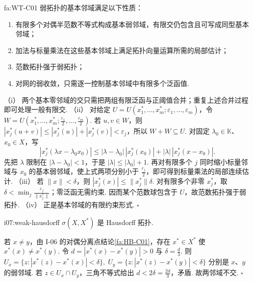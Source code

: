 \begin{FAProposition}[C][弱邻域计算工具]{fa:WT-C01}
弱拓扑的基本邻域满足以下性质：
\begin{enumerate}[label=\textnormal{(\roman*)}]
\item 有限多个对偶半范数不等式构成基本弱邻域，有限交仍包含且可写成同型基本邻域；
\item 加法与标量乘法在这些基本邻域上满足拓扑向量运算所需的局部估计；
\item 范数拓扑强于弱拓扑；
\item 对网的弱收敛，只需逐一控制基本邻域中有限多个泛函值.
\end{enumerate}
\end{FAProposition}

\begin{FAProof}
（i） 两个基本零邻域的交只需把两组有限泛函与正阈值合并；重复上述合并过程即可处理一般有限交. （ii） 对给定 \(\displaystyle U=U(x_1^*,\dots,x_m^*;\varepsilon_1,\dots,\varepsilon_m)\)，令 \(\displaystyle W=U(x_1^*,\dots,x_m^*;\frac{\varepsilon_1}{2},\dots,\frac{\varepsilon_m}{2})\). 若 \(\displaystyle u,v\in W\)，则 \(\displaystyle |x_j^*(u+v)|\leqslant|x_j^*(u)|+|x_j^*(v)|<\varepsilon_j\)，所以 \(\displaystyle W+W\subseteq U\). 对固定 \(\displaystyle \lambda_0\in\mathbb K\)、\(\displaystyle x_0\in X\)，写
\[
|x_j^*(\lambda x-\lambda_0x_0)|
\leqslant |\lambda-\lambda_0|\,|x_j^*(x_0)|
+|\lambda|\,|x_j^*(x-x_0)|.
\]
先把 \(\displaystyle \lambda\) 限制在 \(\displaystyle |\lambda-\lambda_0|<1\)，于是 \(\displaystyle |\lambda|\leqslant|\lambda_0|+1\). 再对有限多个 \(\displaystyle j\) 同时缩小标量邻域与 \(\displaystyle x_0\) 的基本弱邻域，使上式两项分别小于 \(\displaystyle \frac{\varepsilon_j}{2}\)，即可得到标量乘法的局部连续估计. （iii） 若 \(\displaystyle \|x\|<\delta\)，则 \(\displaystyle |x_j^*(x)|\leqslant\|x_j^*\|\delta\). 对有限多个非零 \(\displaystyle x_j^*\)，取 \(\displaystyle \delta<\min_j\frac{\varepsilon_j}{\|x_j^*\|}\)；零泛函无需约束. 因而某个范数球包含于 \(\displaystyle U\)，故范数拓扑强于弱拓扑. （iv） 正是基本邻域的有限约束形式.
\hfill\(\square\)
\end{FAProof}

\begin{FAProposition}[B][弱拓扑为Hausdorff]{i07:weak-hausdorff}
\(\displaystyle \sigma(X,X^*)\) 是 Hausdorff 拓扑.
\end{FAProposition}

\begin{FAProof}
若 \(\displaystyle x\neq y\)，由 I-06 的对偶分离点结论\autoref{fa:HB-C01}，存在 \(\displaystyle x^*\in X^*\) 使 \(\displaystyle x^*(x)\neq x^*(y)\). 令 \(\displaystyle d=|x^*(x)-x^*(y)|>0\) 与 \(\displaystyle \delta=\frac{d}{3}\). 则 \(\displaystyle U_x=\{z:|x^*(z)-x^*(x)|<\delta\}, \; U_y=\{z:|x^*(z)-x^*(y)|<\delta\}\)
分别是 \(\displaystyle x\)、\(\displaystyle y\) 的弱邻域. 若 \(\displaystyle z\in U_x\cap U_y\)，三角不等式给出 \(\displaystyle d<2\delta=\frac{2d}{3}\)，矛盾. 故两邻域不交.
\hfill\(\square\)
\end{FAProof}

